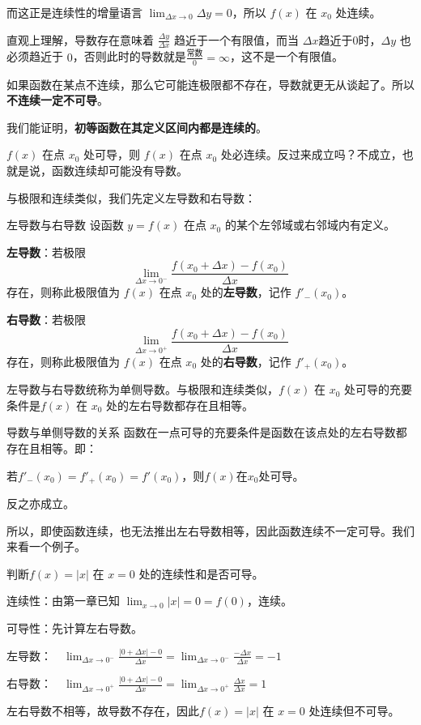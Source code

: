 而这正是连续性的增量语言 $\lim_{\Delta x \to 0} \Delta y = 0$，所以 $f(x)$ 在 $x_0$ 处连续。

直观上理解，导数存在意味着 $\frac{\Delta y}{\Delta x}$ 趋近于一个有限值，而当 $\Delta x$趋近于$0$时，$\Delta y$ 也必须趋近于 $0$，否则此时的导数就是$\frac{\text{常数}}{0}=\infty$，这不是一个有限值。

如果函数在某点不连续，那么它可能连极限都不存在，导数就更无从谈起了。所以\textbf{不连续一定不可导}。

我们能证明，\textbf{初等函数在其定义区间内都是连续的}。

$f(x)$ 在点 $x_0$ 处可导，则 $f(x)$ 在点 $x_0$ 处必连续。反过来成立吗？不成立，也就是说，函数连续却可能没有导数。

与极限和连续类似，我们先定义左导数和右导数：

\begin{definition}{左导数与右导数}{}
设函数 $y = f(x)$ 在点 $x_0$ 的某个左邻域或右邻域内有定义。

\textbf{左导数}：若极限
\[
\lim_{\Delta x \to 0^-} \frac{f(x_0 + \Delta x) - f(x_0)}{\Delta x}
\]
存在，则称此极限值为 $f(x)$ 在点 $x_0$ 处的\textbf{左导数}，记作 $f'_-(x_0)$。

\textbf{右导数}：若极限
\[
\lim_{\Delta x \to 0^+} \frac{f(x_0 + \Delta x) - f(x_0)}{\Delta x}
\]
存在，则称此极限值为 $f(x)$ 在点 $x_0$ 处的\textbf{右导数}，记作 $f'_+(x_0)$。

\end{definition}

左导数与右导数统称为单侧导数。与极限和连续类似，$f(x)$ 在 $x_0$ 处可导的充要条件是$f(x)$ 在 $x_0$ 处的左右导数都存在且相等。

\begin{theorem}{导数与单侧导数的关系}{}
  函数在一点可导的充要条件是函数在该点处的左右导数都存在且相等。即：
  \begin{center}
    若$f'_-(x_0)=f'_+(x_0)=f'(x_0)$，则$f(x)$在$x_0$处可导。
  \end{center}
  反之亦成立。
\end{theorem}

所以，即使函数连续，也无法推出左右导数相等，因此函数连续不一定可导。我们来看一个例子。

\begin{myexample}
  判断$f(x) = |x|$ 在 $x = 0$ 处的连续性和是否可导。

  连续性：由第一章已知 $\lim_{x \to 0} |x| = 0 = f(0)$，连续。

  可导性：先计算左右导数。
  
    左导数：$\quad \lim_{\Delta x \to 0^-} \frac{|0 + \Delta x| - 0}{\Delta x}
    = \lim_{\Delta x \to 0^-} \frac{-\Delta x}{\Delta x} = -1$

    右导数：$\quad \lim_{\Delta x \to 0^+} \frac{|0 + \Delta x| - 0}{\Delta x}
    = \lim_{\Delta x \to 0^+} \frac{\Delta x}{\Delta x} = 1$
  
  左右导数不相等，故导数不存在，因此$f(x) = |x|$ 在 $x = 0$ 处连续但不可导。

\end{myexample}

